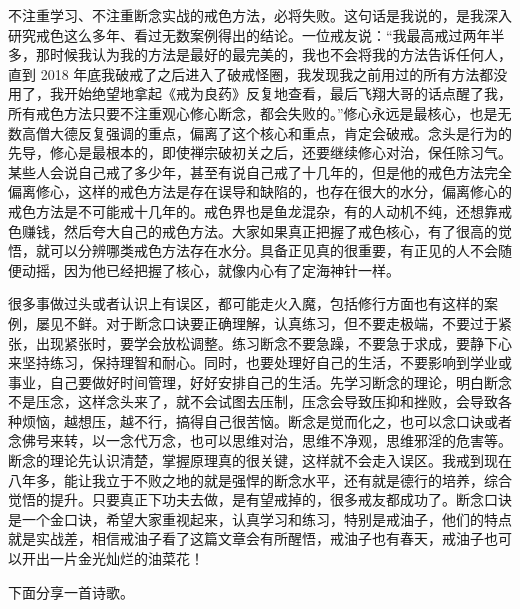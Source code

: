不注重学习、不注重断念实战的戒色方法，必将失败。这句话是我说的，是我深入研究戒色这么多年、看过无数案例得出的结论。一位戒友说：“我最高戒过两年半多，那时候我认为我的方法是最好的最完美的，我也不会将我的方法告诉任何人，直到 2018 年底我破戒了之后进入了破戒怪圈，我发现我之前用过的所有方法都没用了，我开始绝望地拿起《戒为良药》反复地查看，最后飞翔大哥的话点醒了我，所有戒色方法只要不注重观心修心断念，都会失败的。”修心永远是最核心，也是无数高僧大德反复强调的重点，偏离了这个核心和重点，肯定会破戒。念头是行为的先导，修心是最根本的，即使禅宗破初关之后，还要继续修心对治，保任除习气。某些人会说自己戒了多少年，甚至有说自己戒了十几年的，但是他的戒色方法完全偏离修心，这样的戒色方法是存在误导和缺陷的，也存在很大的水分，偏离修心的戒色方法是不可能戒十几年的。戒色界也是鱼龙混杂，有的人动机不纯，还想靠戒色赚钱，然后夸大自己的戒色方法。大家如果真正把握了戒色核心，有了很高的觉悟，就可以分辨哪类戒色方法存在水分。具备正见真的很重要，有正见的人不会随便动摇，因为他已经把握了核心，就像内心有了定海神针一样。

很多事做过头或者认识上有误区，都可能走火入魔，包括修行方面也有这样的案例，屡见不鲜。对于断念口诀要正确理解，认真练习，但不要走极端，不要过于紧张，出现紧张时，要学会放松调整。练习断念不要急躁，不要急于求成，要静下心来坚持练习，保持理智和耐心。同时，也要处理好自己的生活，不要影响到学业或事业，自己要做好时间管理，好好安排自己的生活。先学习断念的理论，明白断念不是压念，这样念头来了，就不会试图去压制，压念会导致压抑和挫败，会导致各种烦恼，越想压，越不行，搞得自己很苦恼。断念是觉而化之，也可以念口诀或者念佛号来转，以一念代万念，也可以思维对治，思维不净观，思维邪淫的危害等。断念的理论先认识清楚，掌握原理真的很关键，这样就不会走入误区。我戒到现在八年多，能让我立于不败之地的就是强悍的断念水平，还有就是德行的培养，综合觉悟的提升。只要真正下功夫去做，是有望戒掉的，很多戒友都成功了。断念口诀是一个金口诀，希望大家重视起来，认真学习和练习，特别是戒油子，他们的特点就是实战差，相信戒油子看了这篇文章会有所醒悟，戒油子也有春天，戒油子也可以开出一片金光灿烂的油菜花！

下面分享一首诗歌。

